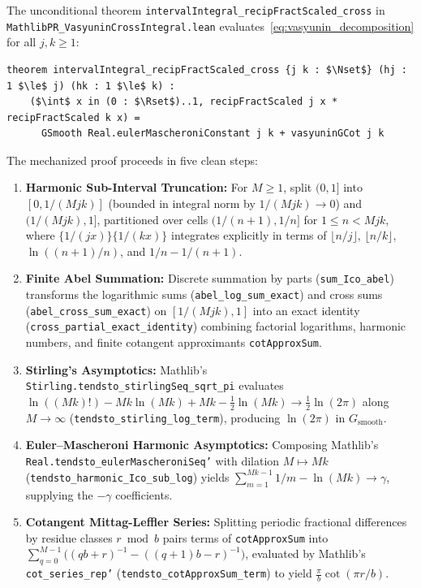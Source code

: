 \documentclass[11pt,a4paper]{article}
\theoremstyle{definition}
\newcommand{\Nset}{\mathbb{N}}
\newcommand{\Rset}{\mathbb{R}}
\begin{document}
The unconditional theorem \texttt{interval\allowbreak Integral\_\allowbreak recip\allowbreak Fract\allowbreak Scaled\_\allowbreak cross} in \texttt{MathlibPR\_\allowbreak Vasyunin\allowbreak Cross\allowbreak Integral.lean} evaluates~\eqref{eq:vasyunin_decomposition} for all $j, k \ge 1$:
\begin{lstlisting}
theorem intervalIntegral_recipFractScaled_cross {j k : $\Nset$} (hj : 1 $\le$ j) (hk : 1 $\le$ k) :
    ($\int$ x in (0 : $\Rset$)..1, recipFractScaled j x * recipFractScaled k x) =
      GSmooth Real.eulerMascheroniConstant j k + vasyuninGCot j k
\end{lstlisting}
The mechanized proof proceeds in five clean steps:
\begin{enumerate}[noitemsep]
  \item \textbf{Harmonic Sub-Interval Truncation:} For $M \ge 1$, split $(0, 1]$ into $[0, 1/(Mjk)]$ (bounded in integral norm by $1/(Mjk) \to 0$) and $(1/(Mjk), 1]$, partitioned over cells $(1/(n+1), 1/n]$ for $1 \le n < Mjk$, where $\{1/(jx)\}\{1/(kx)\}$ integrates explicitly in terms of $\lfloor n/j \rfloor$, $\lfloor n/k \rfloor$, $\ln((n+1)/n)$, and $1/n - 1/(n+1)$.
  \item \textbf{Finite Abel Summation:} Discrete summation by parts (\texttt{sum\_Ico\_abel}) transforms the logarithmic sums (\texttt{abel\_\allowbreak log\_\allowbreak sum\_\allowbreak exact}) and cross sums (\texttt{abel\_\allowbreak cross\_\allowbreak sum\_\allowbreak exact}) on $[1/(Mjk), 1]$ into an exact identity (\texttt{cross\_\allowbreak partial\_\allowbreak exact\_\allowbreak identity}) combining factorial logarithms, harmonic numbers, and finite cotangent approximants \texttt{cotApproxSum}.
  \item \textbf{Stirling's Asymptotics:} Mathlib's \texttt{Stirling.\allowbreak tendsto\_\allowbreak stirlingSeq\_\allowbreak sqrt\_pi} evaluates $\ln((Mk)!) - Mk\ln(Mk) + Mk - \frac{1}{2}\ln(Mk) \to \frac{1}{2}\ln(2\pi)$ along $M \to \infty$ (\texttt{tendsto\_\allowbreak stirling\_\allowbreak log\_\allowbreak term}), producing $\ln(2\pi)$ in $G_{\mathrm{smooth}}$.
  \item \textbf{Euler--Mascheroni Harmonic Asymptotics:} Composing Mathlib's \texttt{Real.\allowbreak tendsto\_\allowbreak eulerMascheroniSeq'} with dilation $M \mapsto Mk$ (\texttt{tendsto\_\allowbreak harmonic\_\allowbreak Ico\_\allowbreak sub\_\allowbreak log}) yields $\sum_{m=1}^{Mk-1} 1/m - \ln(Mk) \to \gamma$, supplying the $-\gamma$ coefficients.
  \item \textbf{Cotangent Mittag-Leffler Series:} Splitting periodic fractional differences by residue classes $r \bmod b$ pairs terms of \texttt{cotApproxSum} into $\sum_{q=0}^{M-1}\big((qb+r)^{-1} - ((q+1)b-r)^{-1}\big)$, evaluated by Mathlib's \texttt{cot\_series\_rep'} (\texttt{tendsto\_\allowbreak cotApproxSum\_\allowbreak term}) to yield $\frac{\pi}{b}\cot(\pi r/b)$.
\end{enumerate}
\end{document}
